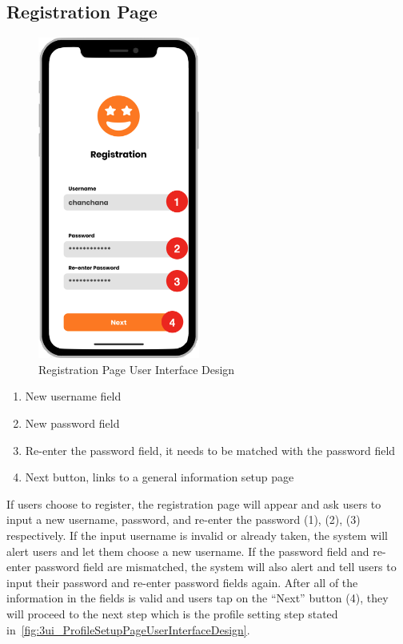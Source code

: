 \documentclass[12pt,oneside,openright,a4paper]{cpe-english-project}
\begin{document}
\subsection{Registration Page}
\begin{figure}[!h]\centering
\includegraphics[height=300pt]{./images/3ui_RegistrationPageUserInterfaceDesign.png}
\caption{Registration Page User Interface Design}\label{fig:3ui_RegistrationPageUserInterfaceDesign}
\end{figure}
\begin{enumerate}
\item New username field
\item New password field
\item Re-enter the password field, it needs to be matched with the password field
\item Next button, links to a general information setup page
\end{enumerate}
If users choose to register, the registration page will appear and ask users to input a new username, password, and re-enter the password (1), (2), (3) respectively. If the input username is invalid or already taken, the system will alert users and let them choose a new username. If the password field and re-enter password field are mismatched, the system will also alert and tell users to input their password and re-enter password fields again. After all of the information in the fields is valid and users tap on the “Next” button (4), they will proceed to the next step which is the profile setting step stated in~\ref{fig:3ui_ProfileSetupPageUserInterfaceDesign}.
\end{document}
